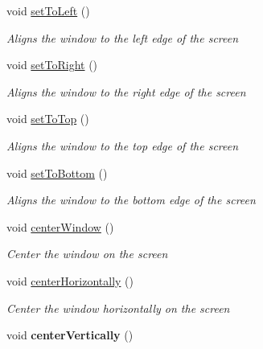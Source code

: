 \begin{DoxyCompactItemize}
\item 
void \hyperlink{class_simple_r_p_g_1_1_windows_1_1_window_acb775f11f8c8783cea6f4f67a79f6c3b}{set\-To\-Left} ()
\begin{DoxyCompactList}\small\item\em Aligns the window to the left edge of the screen \end{DoxyCompactList}\item 
void \hyperlink{class_simple_r_p_g_1_1_windows_1_1_window_a433cb483cb11c552beb7e0bd320786db}{set\-To\-Right} ()
\begin{DoxyCompactList}\small\item\em Aligns the window to the right edge of the screen \end{DoxyCompactList}\item 
void \hyperlink{class_simple_r_p_g_1_1_windows_1_1_window_a74b08442c18312247fca0f7877576fb0}{set\-To\-Top} ()
\begin{DoxyCompactList}\small\item\em Aligns the window to the top edge of the screen \end{DoxyCompactList}\item 
void \hyperlink{class_simple_r_p_g_1_1_windows_1_1_window_aa9c36945f766c669b5ea809fa5700602}{set\-To\-Bottom} ()
\begin{DoxyCompactList}\small\item\em Aligns the window to the bottom edge of the screen \end{DoxyCompactList}\item 
void \hyperlink{class_simple_r_p_g_1_1_windows_1_1_window_ad0f7aa792b7d38d3f3fda829499787ea}{center\-Window} ()
\begin{DoxyCompactList}\small\item\em Center the window on the screen \end{DoxyCompactList}\item 
void \hyperlink{class_simple_r_p_g_1_1_windows_1_1_window_a6db875bd31678f54835428f62ebb5777}{center\-Horizontally} ()
\begin{DoxyCompactList}\small\item\em Center the window horizontally on the screen \end{DoxyCompactList}\item 
\hypertarget{class_simple_r_p_g_1_1_windows_1_1_window_a17fcd782ab64e1e82c5136b7ca835a3a}{void {\bfseries center\-Vertically} ()}\label{class_simple_r_p_g_1_1_windows_1_1_window_a17fcd782ab64e1e82c5136b7ca835a3a}


\end{DoxyCompactItemize}
